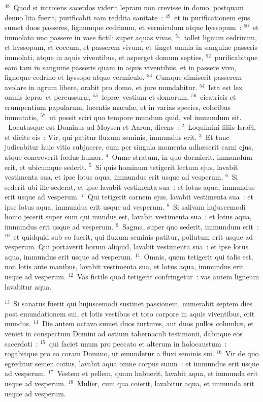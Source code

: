 ${}^{48}$~Quod si introiens sacerdos viderit lepram non crevisse in domo, postquam denuo lita fuerit, purificabit eam reddita sanitate~:
${}^{49}$~et in purificationem ejus sumet duos passeres, lignumque cedrinum, et vermiculum atque hyssopum~:
${}^{50}$~et immolato uno passere in vase fictili super aquas vivas,
${}^{51}$~tollet lignum cedrinum, et hyssopum, et coccum, et passerem vivum, et tinget omnia in sanguine passeris immolati, atque in aquis viventibus, et asperget domum septies,
${}^{52}$~purificabitque eam tam in sanguine passeris quam in aquis viventibus, et in passere vivo, lignoque cedrino et hyssopo atque vermiculo.
${}^{53}$~Cumque dimiserit passerem avolare in agrum libere, orabit pro domo, et jure mundabitur.
${}^{54}$~Ista est lex omnis lepr\ae\ et percussur\ae ,
${}^{55}$~lepr\ae\ vestium et domorum,
${}^{56}$~cicatricis et erumpentium papularum, lucentis macul\ae , et in varias species, coloribus immutatis,
${}^{57}$~ut possit sciri quo tempore mundum quid, vel immundum sit.
~\lettrine[lines=10,image=true,loversize=0.05,lraise=-0.03]{L}{}ocutusque est Dominus ad Moysen et Aaron, dicens~:
${}^{2}$~Loquimini filiis Isra\"el, et dicite eis~: Vir, qui patitur fluxum seminis, immundus erit.
${}^{3}$~Et tunc judicabitur huic vitio subjacere, cum per singula momenta adh\ae serit carni ejus, atque concreverit fœdus humor.
${}^{4}$~Omne stratum, in quo dormierit, immundum erit, et ubicumque sederit.
${}^{5}$~Si quis hominum tetigerit lectum ejus, lavabit vestimenta sua, et ipse lotus aqua, immundus erit usque ad vesperum.
${}^{6}$~Si sederit ubi ille sederat, et ipse lavabit vestimenta sua~: et lotus aqua, immundus erit usque ad vesperum.
${}^{7}$~Qui tetigerit carnem ejus, lavabit vestimenta sua~: et ipse lotus aqua, immundus erit usque ad vesperum.
${}^{8}$~Si salivam hujuscemodi homo jecerit super eum qui mundus est, lavabit vestimenta sua~: et lotus aqua, immundus erit usque ad vesperum.
${}^{9}$~Sagma, super quo sederit, immundum erit~:
${}^{10}$~et quidquid sub eo fuerit, qui fluxum seminis patitur, pollutum erit usque ad vesperum. Qui portaverit horum aliquid, lavabit vestimenta sua~: et ipse lotus aqua, immundus erit usque ad vesperum.
${}^{11}$~Omnis, quem tetigerit qui talis est, non lotis ante manibus, lavabit vestimenta sua, et lotus aqua, immundus erit usque ad vesperum.
${}^{12}$~Vas fictile quod tetigerit confringetur~: vas autem ligneum lavabitur aqua.


${}^{13}$~Si sanatus fuerit qui hujuscemodi sustinet passionem, numerabit septem dies post emundationem sui, et lotis vestibus et toto corpore in aquis viventibus, erit mundus.
${}^{14}$~Die autem octavo sumet duos turtures, aut duos pullos columb\ae , et veniet in conspectum Domini ad ostium tabernaculi testimonii, dabitque eos sacerdoti~:
${}^{15}$~qui faciet unum pro peccato et alterum in holocaustum~: rogabitque pro eo coram Domino, ut emundetur a fluxi seminis sui.
${}^{16}$~Vir de quo egreditur semen coitus, lavabit aqua omne corpus suum~: et immundus erit usque ad vesperum.
${}^{17}$~Vestem et pellem, quam habuerit, lavabit aqua, et immunda erit usque ad vesperum.
${}^{18}$~Mulier, cum qua coierit, lavabitur aqua, et immunda erit usque ad vesperum.


